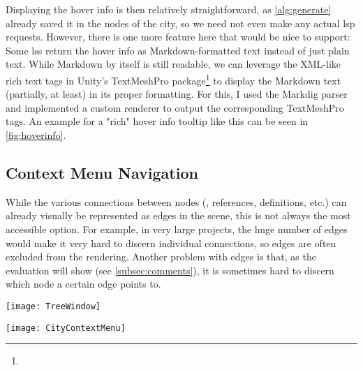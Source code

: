 \documentclass[../thesis]{subfiles}
\begin{document}
Displaying the hover info is then relatively straightforward, as \cref{alg:generate} already saved it in the nodes of the city, so we need not even make any actual \gls{lsp} requests.
However, there is one more feature here that would be nice to support:
Some \glspl{ls} return the hover info as Markdown-formatted text instead of just plain text.
While Markdown by itself is still readable, we can leverage the XML-like rich text tags in Unity's TextMeshPro package\footnote{
} to display the Markdown text (partially, at least) in its proper formatting.
For this, I used the Markdig parser~\cite{mutel2024} and implemented a custom renderer to output the corresponding TextMeshPro tags.
An example for a "rich" hover info tooltip like this can be seen in \cref{fig:hoverinfo}.

\subsection{Context Menu Navigation}\label{subsec:citycontext}
While the various connections between nodes (\ie{}, references, definitions, etc.) can already visually be represented as edges in the scene, this is not always the most accessible option.
For example, in very large projects, the huge number of edges would make it very hard to discern individual connections, so edges are often excluded from the rendering.
Another problem with edges is that, as the evaluation will show (see \cref{subsec:comments}), it is sometimes hard to discern which node a certain edge points to.

\begin{minipage}[t]{.75\textwidth}
	\centering
	\texttt{[image: TreeWindow]}
	\label{fig:treeview}
\end{minipage}%
\begin{minipage}[t]{.25\textwidth}
	\captionsetup{format=plain}
	\centering
	\texttt{[image: CityContextMenu]}
	\label{fig:contextcity}
\end{minipage}
\end{document}
